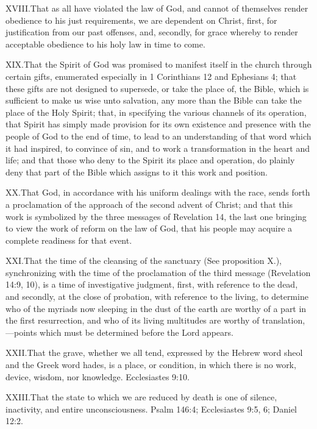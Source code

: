 \lettrine{XVIII.} That as all have violated the law of God, and cannot of themselves render obedience to his just requirements, we are dependent on Christ, first, for justification from our past offenses, and, secondly, for grace whereby to render acceptable obedience to his holy law in time to come.

\lettrine{XIX.} That the Spirit of God was promised to manifest itself in the church through certain gifts, enumerated especially in 1 Corinthians 12 and Ephesians 4; that these gifts are not designed to supersede, or take the place of, the Bible, which is sufficient to make us wise unto salvation, any more than the Bible can take the place of the Holy Spirit; that, in specifying the various channels of its operation, that Spirit has simply made provision for its own existence and presence with the people of God to the end of time, to lead to an understanding of that word which it had inspired, to convince of sin, and to work a transformation in the heart and life; and that those who deny to the Spirit its place and operation, do plainly deny that part of the Bible which assigns to it this work and position.

\lettrine{XX.} That God, in accordance with his uniform dealings with the race, sends forth a proclamation of the approach of the second advent of Christ; and that this work is symbolized by the three messages of Revelation 14, the last one bringing to view the work of reform on the law of God, that his people may acquire a complete readiness for that event.

\lettrine{XXI.} That the time of the cleansing of the sanctuary (See proposition X.), synchronizing with the time of the proclamation of the third message (Revelation 14:9, 10), is a time of investigative judgment, first, with reference to the dead, and secondly, at the close of probation, with reference to the living, to determine who of the myriads now sleeping in the dust of the earth are worthy of a part in the first resurrection, and who of its living multitudes are worthy of translation,—points which must be determined before the Lord appears.

\lettrine{XXII.} That the grave, whether we all tend, expressed by the Hebrew word sheol and the Greek word hades, is a place, or condition, in which there is no work, device, wisdom, nor knowledge. Ecclesiastes 9:10.

\lettrine{XXIII.} That the state to which we are reduced by death is one of silence, inactivity, and entire unconsciousness. Psalm 146:4; Ecclesiastes 9:5, 6; Daniel 12:2.

